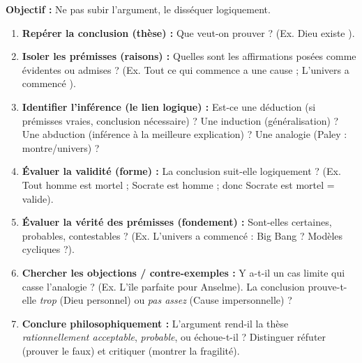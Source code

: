 \documentclass[11pt]{article}
\begin{document}
\begin{methode}
\textbf{Objectif :} Ne pas subir l'argument, le disséquer logiquement.
\begin{enumerate}
    \item \textbf{Repérer la conclusion (thèse) :} Que veut-on prouver ? (Ex. \guillemotleft Dieu existe \guillemotright).
    \item \textbf{Isoler les prémisses (raisons) :} Quelles sont les affirmations posées comme évidentes ou admises ? (Ex. \guillemotleft Tout ce qui commence a une cause \guillemotright ; \guillemotleft L'univers a commencé \guillemotright).
    \item \textbf{Identifier l'inférence (le lien logique) :} Est-ce une déduction (si prémisses vraies, conclusion nécessaire) ? Une induction (généralisation) ? Une abduction (inférence à la meilleure explication) ? Une analogie (Paley : montre/univers) ?
    \item \textbf{Évaluer la validité (forme) :} La conclusion suit-elle logiquement ? (Ex. \guillemotleft Tout homme est mortel ; Socrate est homme ; donc Socrate est mortel \guillemotright = valide).
    \item \textbf{Évaluer la vérité des prémisses (fondement) :} Sont-elles certaines, probables, contestables ? (Ex. \guillemotleft L'univers a commencé \guillemotright : Big Bang ? Modèles cycliques ?).
    \item \textbf{Chercher les objections / contre-exemples :} Y a-t-il un \guillemotleft cas limite \guillemotright qui casse l'analogie ? (Ex. \guillemotleft L'île parfaite \guillemotright pour Anselme). La conclusion prouve-t-elle \emph{trop} (Dieu personnel) ou \emph{pas assez} (Cause impersonnelle) ?
    \item \textbf{Conclure philosophiquement :} L'argument rend-il la thèse \emph{rationnellement acceptable}, \emph{probable}, ou échoue-t-il ? Distinguer \guillemotleft réfuter \guillemotright (prouver le faux) et \guillemotleft critiquer \guillemotright (montrer la fragilité).
\end{enumerate}
\end{methode}
\end{document}
